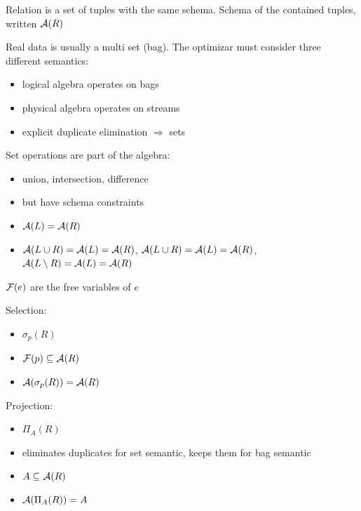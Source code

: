 \documentclass[11pt]{article}
\begin{document}
Relation is a set of tuples with the same schema. Schema of the contained tuples,
written \(\mathcal{A}(R)\)

Real data is usually a multi set (bag). The optimizar must consider three different semantics:
\begin{itemize}
\item logical algebra operates on bags
\item physical algebra operates on streams
\item explicit duplicate elimination \(\Rightarrow\) sets
\end{itemize}

Set operations are part of the algebra:
\begin{itemize}
\item union, intersection, difference
\item but have schema constraints
\item \(\mathcal{A}(L)=\mathcal{A}(R)\)
\item \(\mathcal{A}(L\cup R)=\mathcal{A}(L)=\mathcal{A}(R)\), \(\mathcal{A}(L\cup R)=\mathcal{A}(L)=\mathcal{A}(R)\), \(\mathcal{A}(L\setminus R)=\mathcal{A}(L)=\mathcal{A}(R)\)
\end{itemize}

\(\mathcal{F}(e)\) are the free variables of \(e\)

Selection:
\begin{itemize}
\item \(\sigma_p(R)\)
\item \(\mathcal{F}(p)\subseteq\mathcal{A}(R)\)
\item \(\mathcal{A}(\sigma_p(R))=\mathcal{A}(R)\)
\end{itemize}

Projection:
\begin{itemize}
\item \(\Pi_A(R)\)
\item eliminates duplicates for set semantic, keeps them for bag semantic
\item \(A\subseteq\mathcal{A}(R)\)
\item \(\mathcal{A}(\Pi_A(R))=A\)
\end{itemize}
\end{document}
